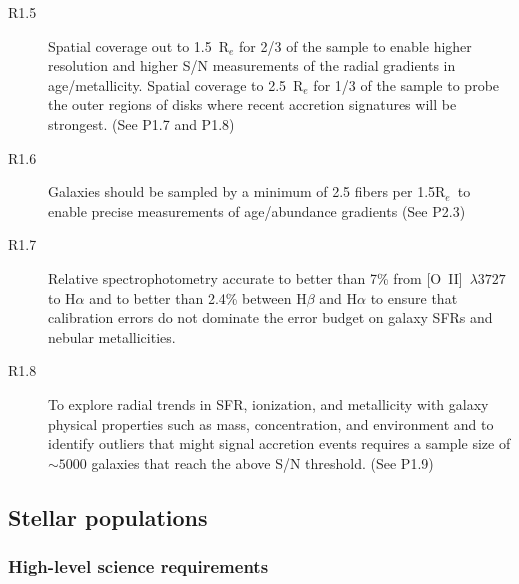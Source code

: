 \documentclass[preprint,11pt]{aastex}
\newcommand{\Reff}{{R$_{e}$}}
\begin{document}
\begin{description}

\item[R1.5] Spatial coverage out to 1.5~R$_e$ for 2/3 of the sample to
enable higher resolution and higher S/N measurements of the radial
gradients in age/metallicity. Spatial coverage to 2.5~R$_e$ for 1/3 of the
sample to probe the outer regions of disks where recent accretion signatures  
will be strongest. (See P1.7 and P1.8)

\item[R1.6] Galaxies should be sampled by a minimum of 2.5 fibers per 1.5\Reff\
 to enable precise measurements of age/abundance gradients (See P2.3)


\item[R1.7] Relative spectrophotometry accurate to better than 7\%
  from [O~II]~$\lambda3727$ to H$\alpha$ and to better than 2.4\%
  between H$\beta$ and H$\alpha$ to ensure that calibration errors do
  not dominate the error budget on galaxy SFRs and nebular
  metallicities.

\item[R1.8] To explore radial trends in SFR, ionization, and metallicity
  with galaxy physical properties such as mass, concentration, and 
  environment and to identify outliers that might signal accretion 
  events requires a sample size of $\sim5000$ galaxies that reach 
  the above S/N threshold. (See P1.9)


\end{description}


\subsection{Stellar populations}\label{sec:requirements_stellar_pops}

\subsubsection{High-level science requirements}
\end{document}
